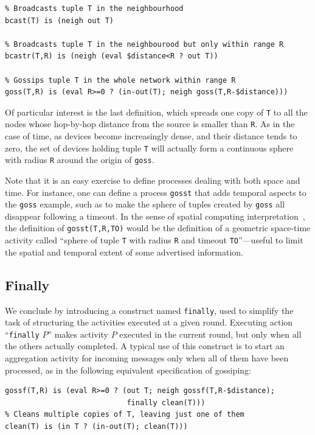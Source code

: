 \documentclass[12pt,a4paper,twoside,openright]{book}
\begin{document}
{\begin{verbatim}
% Broadcasts tuple T in the neighbourhood
bcast(T) is (neigh out T)

% Broadcasts tuple T in the neighbourood but only within range R 
bcastr(T,R) is (neigh (eval $distance<R ? out T))

% Gossips tuple T in the whole network within range R
goss(T,R) is (eval R>=0 ? (in-out(T); neigh goss(T,R-$distance)))
\end{verbatim}}

\noindent Of particular interest is the last definition, which spreads one copy of \texttt{T} to all the nodes whose hop-by-hop distance from the source is smaller than \texttt{R}.
%
As in the case of time, as devices become increasingly dense, and their distance tends to zero, the set of devices holding tuple \texttt{T} will actually form a continuous sphere with radius \texttt{R} around the origin of \texttt{goss}.

Note that it is an easy exercise to define processes dealing with both space and time.
%
For instance, one can define a process \texttt{gosst} that adds temporal aspects to the \texttt{goss} example, such as to make the sphere of tuples created by \texttt{goss} all disappear following a timeout.
%
In the sense of spatial computing interpretation~\cite{proto}, the definition of \texttt{gosst(T,R,TO)} would be the definition of a geometric space-time activity called ``sphere of tuple \texttt{T} with radius \texttt{R} and timeout \texttt{TO}''---useful to limit the spatial and temporal extent of some advertised information.

\subsection{Finally}

We conclude by introducing a construct named \texttt{finally}, used to simplify the task of structuring the activities executed at a given round.
%
Executing action ``\texttt{finally} $P$'' makes activity $P$ executed in the current round, but only when all the others actually completed.
%
A typical use of this construct is to start an aggregation activity for incoming messages only when all of them have been processed, as in the following equivalent specification of gossiping:
{
\begin{verbatim}
gossf(T,R) is (eval R>=0 ? (out T; neigh gossf(T,R-$distance); 
                            finally clean(T)))
% Cleans multiple copies of T, leaving just one of them
clean(T) is (in T ? (in-out(T); clean(T)))
\end{verbatim}
}
\end{document}
